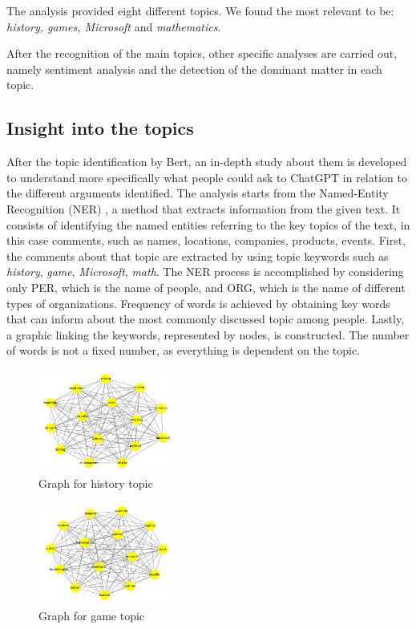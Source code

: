 \documentclass[sigchi]{acmart}
\begin{document}
The analysis provided eight different topics. We found the most relevant to be: \textit{history, games, Microsoft} and \textit{mathematics}.

After the recognition of the main topics, other specific analyses are carried out, namely sentiment analysis and the detection of the dominant matter in each topic. 



\subsection{Insight into the topics}
After the topic identification by Bert, an in-depth study about them is developed to understand more specifically what people could ask to ChatGPT in relation to the different arguments identified. The analysis starts from the Named-Entity Recognition (NER) \cite{NER}, a method that extracts information from the given text. It consists of identifying the named entities referring to the key topics of the text, in this case comments, such as names, locations, companies, products, events. First, the comments about that topic are extracted by using topic keywords such as \textit{history}, \textit{game}, \textit{Microsoft}, \textit{math}. The NER process is accomplished by considering only \textsc{PER}, which is the name of people, and \textsc{ORG}, which is the name of different types of organizations. Frequency of words is achieved by obtaining key words that can inform about the most commonly discussed topic among people. Lastly, a graphic linking the keywords, represented by nodes, is constructed. The number of words is not a fixed number, as everything is dependent on the topic. 
 

\begin{figure}[H]
  \centering
  \includegraphics[width=0.4\textwidth]{primo.png}
  \caption{Graph for history topic}
  \label{fig:immagine_history}
\end{figure}



\begin{figure}[H]
  \centering
  \includegraphics[width=0.4\textwidth]{secondo.png}
  \caption{Graph for game topic}
  \label{fig:immagine_game}
\end{figure}
\end{document}
